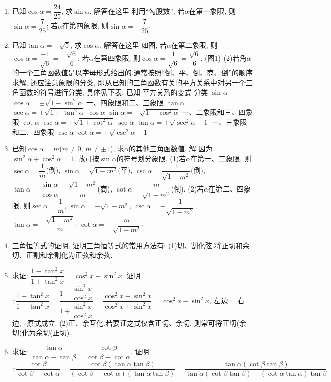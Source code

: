 \documentclass[10pt,a4paper]{article}
\begin{document}
\begin{enumerate}[1.]


\item 已知$\cos \alpha =\dfrac{24}{25}$, 求$\sin \alpha$.		
解答在这里  利用``勾股数'', 若$\alpha$在第一象限, 则$\sin \alpha =\dfrac 7{25}$; 若$\alpha$在第四象限, 则$\sin \alpha =-\dfrac 7{25}$.
\item 已知$\tan \alpha =-\sqrt 5$, 求$\cos \alpha$.
解答在这里 如图, 若$\alpha$在第二象限, 则$\cos \alpha =\dfrac{-1}{\sqrt 6}=-\dfrac{\sqrt 6}6$; 若$\alpha$在第四象限, 则$\cos \alpha =\dfrac 1{\sqrt 6}=\dfrac{\sqrt 6}6$.
(图1)
(2)若角$\alpha$的一个三角函数值是以字母形式给出的.通常按照``倒、平、倒、商、倒''的顺序求解, 还应注意象限的分类, 即从已知的三角函数有关的平方关系中对另一个三角函数的符号进行分类, 具体见下表:
已知	平方关系的变式	分类
$\sin \alpha$	$\cos \alpha =\pm \sqrt {1-\sin ^2\alpha }$	一、四象限和二、三象限
$\tan \alpha$	$\sec \alpha =\pm \sqrt {1+\tan ^2\alpha }$	
$\cos \alpha$	$\sin \alpha =\pm \sqrt {1-\cos ^2\alpha }$	一、二象限和三、四象限
$\cot \alpha$	$\csc \alpha =\pm \sqrt {1+\cot ^2\alpha }$	
$\sec \alpha$	$\tan \alpha =\pm \sqrt {\sec ^2\alpha -1}$	一、三象限和二、四象限
$\csc \alpha$	$\cot \alpha =\pm \sqrt {\csc ^2\alpha -1}$	
\item 已知$\cos \alpha =m$($m\ne 0$, $m\ne \pm 1$), 求$\alpha$的其他三角函数值.
解  因为$\sin ^2\alpha +\cos ^2\alpha =1$, 故可按$\sin \alpha$的符号划分象限.
(1)若$\alpha$在第一、二象限, 则$\sec \alpha =\dfrac 1m$(倒), $\sin \alpha =\sqrt {1-m^2}$(平), $\csc \alpha =\dfrac 1{\sqrt {1-m^2}}$(倒), $\tan \alpha =\dfrac{\sin \alpha }{\cos \alpha }=\dfrac{\sqrt {1-m^2}}m$(商), $\cot \alpha =\dfrac m{\sqrt {1-m^2}}$(倒).
(2)若$\alpha$在第二、四象限, 则$\sec \alpha =\dfrac 1m$, $\sin \alpha =-\sqrt {1-m^2}$, $\csc \alpha =-\dfrac 1{\sqrt {1-m^2}}$, $\tan \alpha =-\dfrac{\sqrt {1-m^2}}m$, $\cot \alpha =-\dfrac m{\sqrt {1-m^2}}$.
\item 三角恒等式的证明.
证明三角恒等式的常用方法有:
(1)切、割化弦.将正切和余切、正割和余割化为正弦和余弦.
\item 求证: $\dfrac{1-\tan ^2x}{1+\tan ^2x}=\cos ^2x-\sin ^2x$.
证明  $\because \dfrac{1-\tan ^2x}{1+\tan ^2x}=\dfrac{1-\dfrac{\sin ^2x}{\cos ^2x}}{1+\dfrac{\sin ^2x}{\cos ^2x}}=\dfrac{\cos ^2x-\sin ^2x}{\cos ^2x+\sin ^2x}=\cos ^2x-\sin ^2x$, 左边$=$右边,
$\therefore$原式成立.
(2)正、余互化.若要证之式仅含正切、余切, 则常可将正切(余切)化为余切(正切).
\item 求证: $\dfrac{\tan \alpha }{\tan \alpha -\tan \beta }=\dfrac{\cot \beta }{\cot \beta -\cot \alpha }$.
证明  $\because \dfrac{\cot \beta }{\cot \beta -\cot \alpha }=\dfrac{\cot \beta (\tan \alpha \tan \beta)}{(\cot \beta -\cot \alpha)(\tan \alpha \tan \beta)}=\dfrac{\tan \alpha (\cot \beta \tan \beta)}{\tan \alpha (\cot \beta \tan \beta)-(\cot \alpha \tan \alpha)\tan \beta }$

\end{enumerate}
\end{document}
